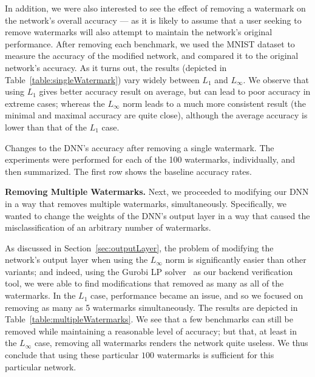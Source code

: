 \documentclass{easychair}
\newcommand{\guy}[1]{\marginpar{\textcolor{orange}{Guy: #1}}}
\begin{document}
In addition, we were also interested to see the effect of removing a
watermark on the network's overall accuracy --- as it is likely to
assume that a user seeking to remove watermarks will also attempt to
maintain the network's original performance. After removing each
benchmark, we used the MNIST dataset to measure the accuracy of the
modified network, and compared it to the original network's accuracy. As it turns out, the
results (depicted in Table~\ref{table:singleWatermark})
vary widely between $L_1$ and $L_\infty$. We observe that using 
$L_1$ gives better accuracy result on average, but can lead to poor
accuracy in extreme cases; whereas the $L_\infty$ norm leads to a much
more consistent result (the minimal and maximal
accuracy are quite close), although the average accuracy is lower than
that of the $L_1$ case. 

\begin{table}
\caption{Changes to the DNN's accuracy after removing a single
  watermark. The experiments were performed for each of the
  100 watermarks, individually, and then summarized. The first row
  shows the baseline accuracy rates.}
\label{table:singleWatermark}
\end{table}
\guy{Please avoid abbreviations in the heading row; increase the row
  height and use two lines. Please write $L_1$ and $L_\infty$ instead
  of ``Infinity'' and ``One'', and move the ``Norm'' column to be 2nd
  from the left. Similar changes needed in the other tables}

\medskip\noindent \textbf{Removing Multiple Watermarks.}
Next, we proceeded to modifying our DNN in a way that
removes multiple watermarks, simultaneously. Specifically, we wanted
to change the weights of the DNN's output layer in a way that caused
the misclassification of an arbitrary number of watermarks.

As discussed in Section~\ref{sec:outputLayer}, the problem of modifying the network's
output layer when using the $L_\infty$ norm is significantly easier
than other variants; and indeed, using the Gurobi LP solver~\cite{gurobi} as our backend
verification tool, we were able to find modifications
that removed as many as all of the watermarks. In the $L_1$ case,
performance became an issue, and so we focused on removing as many as
5 watermarks simultaneously. The results are depicted in
Table~\ref{table:multipleWatermarks}. We see that a few benchmarks can
still be removed while maintaining a reasonable level of accuracy; but
that, at least in the $L_\infty$ case, removing all watermarks renders
the network quite useless. We thus conclude that using these particular $100$
watermarks is sufficient for this particular network.
\end{document}
